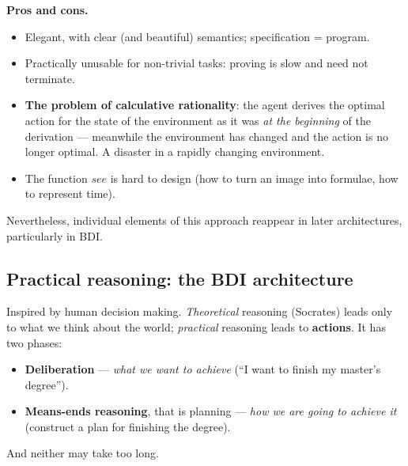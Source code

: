 \documentclass[11pt,a4paper]{article}
\theoremstyle{definition}
\providecommand{\uv}[1]{``#1''}
\begin{document}
\medskip
\noindent\textbf{Pros and cons.}
\begin{itemize}
\item[$+$] Elegant, with clear (and beautiful) semantics; specification = program.
\item[$-$] Practically unusable for non-trivial tasks: proving is slow and need not terminate.
\item[$-$] \textbf{The problem of calculative rationality}: the agent derives the optimal action for
  the state of the environment as it was \emph{at the beginning} of the derivation --- meanwhile the
  environment has changed and the action is no longer optimal. A disaster in a rapidly changing
  environment.
\item[$-$] The function $\mathit{see}$ is hard to design (how to turn an image into formulae, how to
  represent time).
\end{itemize}
Nevertheless, individual elements of this approach reappear in later architectures, particularly in
BDI.

\subsection{Practical reasoning: the BDI architecture}

\begin{defbox}
Inspired by human decision making. \emph{Theoretical} reasoning (Socrates) leads only to what we
think about the world; \emph{practical} reasoning leads to \textbf{actions}. It has two phases:
\begin{itemize}
\item \textbf{Deliberation} --- \emph{what we want to achieve}
  (\uv{I want to finish my master's degree}).
\item \textbf{Means-ends reasoning}, that is planning --- \emph{how we are going to achieve it}
  (construct a plan for finishing the degree).
\end{itemize}
And neither may take too long.
\end{defbox}
\end{document}
